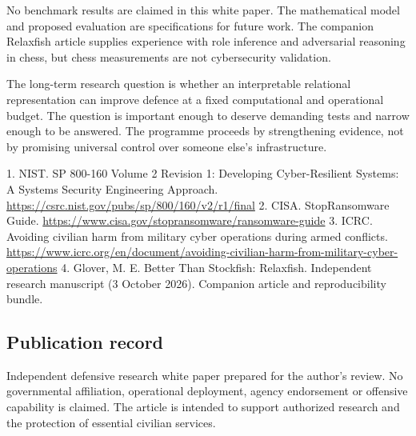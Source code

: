 \documentclass[11pt]{article}
\begin{document}
No benchmark results are claimed in this white paper. The mathematical model and proposed evaluation are specifications for future work. The companion Relaxfish article supplies experience with role inference and adversarial reasoning in chess, but chess measurements are not cybersecurity validation.

The long-term research question is whether an interpretable relational representation can improve defence at a fixed computational and operational budget. The question is important enough to deserve demanding tests and narrow enough to be answered. The programme proceeds by strengthening evidence, not by promising universal control over someone else's infrastructure.

1. NIST. SP 800-160 Volume 2 Revision 1: Developing Cyber-Resilient Systems: A Systems Security Engineering Approach. \url{https://csrc.nist.gov/pubs/sp/800/160/v2/r1/final}
2. CISA. StopRansomware Guide. \url{https://www.cisa.gov/stopransomware/ransomware-guide}
3. ICRC. Avoiding civilian harm from military cyber operations during armed conflicts. \url{https://www.icrc.org/en/document/avoiding-civilian-harm-from-military-cyber-operations}
4. Glover, M. E. Better Than Stockfish: Relaxfish. Independent research manuscript (3 October 2026). Companion article and reproducibility bundle.

\subsection*{Publication record}
Independent defensive research white paper prepared for the author's review. No governmental affiliation, operational deployment, agency endorsement or offensive capability is claimed. The article is intended to support authorized research and the protection of essential civilian services.
\end{document}
